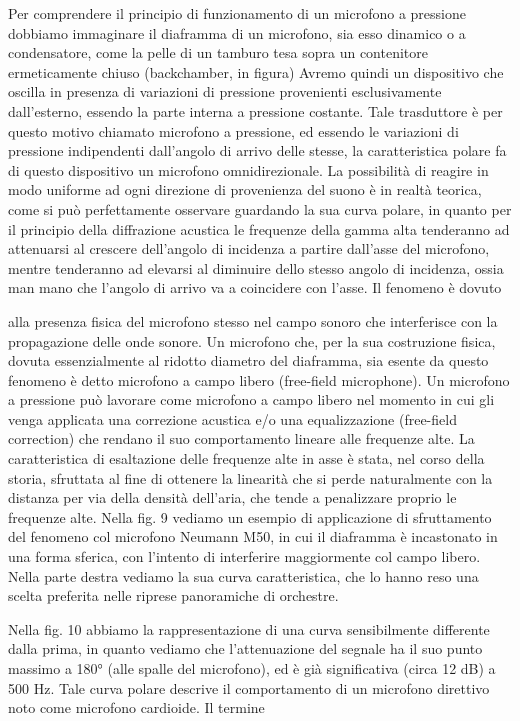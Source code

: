 Per comprendere il principio di funzionamento di un microfono a pressione dobbiamo immaginare il diaframma di un microfono, sia esso dinamico o a condensatore, come la pelle di un tamburo tesa sopra un contenitore ermeticamente chiuso (backchamber, in figura) Avremo quindi un dispositivo che oscilla in presenza di variazioni di pressione provenienti esclusivamente dall’esterno, essendo la parte interna a pressione costante. Tale trasduttore è per questo motivo chiamato microfono a pressione, ed essendo le variazioni di pressione indipendenti dall’angolo di arrivo delle stesse, la caratteristica polare fa di questo dispositivo un microfono omnidirezionale.
La possibilità di reagire in modo uniforme ad ogni direzione di provenienza del suono è in realtà teorica, come si può perfettamente osservare guardando la sua curva polare, in quanto per il principio della diffrazione acustica le frequenze della gamma alta tenderanno ad attenuarsi al crescere dell’angolo di incidenza a partire dall’asse del microfono, mentre tenderanno ad elevarsi al diminuire dello stesso angolo di incidenza, ossia man mano che l’angolo di arrivo va a coincidere con l’asse. Il fenomeno è dovuto

alla presenza fisica del microfono stesso nel campo sonoro che interferisce con la propagazione delle onde sonore. Un microfono che, per la sua costruzione fisica, dovuta essenzialmente al ridotto diametro del diaframma, sia esente da questo fenomeno è detto microfono a campo libero (free-field microphone). Un microfono a pressione può lavorare come microfono a campo libero nel momento in cui gli venga applicata una correzione acustica e/o una equalizzazione (free-field correction) che rendano il suo comportamento lineare alle frequenze alte.
La caratteristica di esaltazione delle frequenze alte in asse è stata, nel corso della storia, sfruttata al fine di ottenere la linearità che si perde naturalmente con la distanza per via della densità dell’aria, che tende a penalizzare proprio le frequenze alte. Nella fig. 9 vediamo un esempio di applicazione di sfruttamento del fenomeno col microfono Neumann M50, in cui il diaframma è incastonato in una forma sferica, con l’intento di interferire maggiormente col campo libero. Nella parte destra vediamo la sua curva caratteristica, che lo hanno reso una scelta preferita nelle riprese panoramiche di orchestre.

Nella fig. 10 abbiamo la rappresentazione di una curva sensibilmente differente dalla prima, in quanto vediamo che l’attenuazione del segnale ha il suo punto massimo a 180° (alle spalle del microfono), ed è già significativa (circa 12 dB) a 500 Hz. Tale curva polare descrive il comportamento di un microfono direttivo noto come microfono cardioide. Il termine


